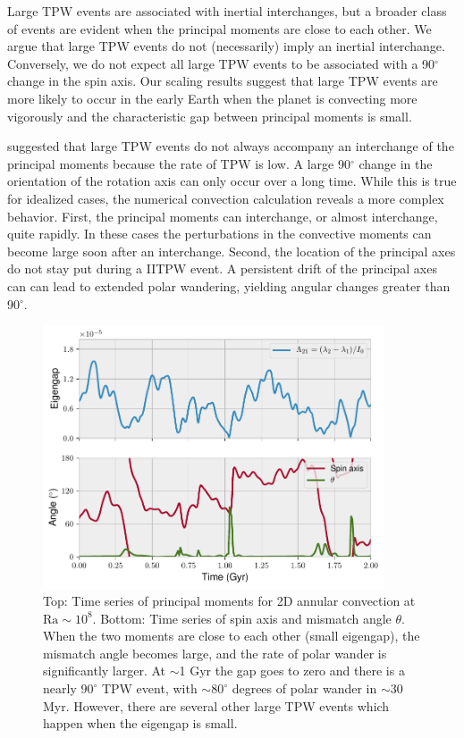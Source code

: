 \documentclass[preprint,12pt,authoryear]{elsarticle}
\begin{document}
Large TPW events are associated with inertial interchanges, but a broader class of events are evident
when the principal moments are close to each other. We argue that large TPW events do not (necessarily) imply an inertial interchange. Conversely, we do not expect all large TPW events to be associated with a 90$^{\circ}$ change in the spin axis. Our scaling results suggest that large TPW events are more likely to occur in the early Earth when the planet is convecting more vigorously and the characteristic gap between principal moments is small.


\citet{tsai2007theoretical} suggested that large TPW events do not always accompany an interchange of the principal moments because the rate of TPW is low. A large 90$^{\circ}$ change in the orientation of the rotation axis can only occur over a long time.  While
this is true for idealized cases, the numerical convection calculation reveals a more complex behavior. 
First, the principal moments can interchange, or almost interchange, quite rapidly. In these cases  the perturbations in the convective moments can become large soon after an interchange.
Second, the location of the principal axes do not stay put during a IITPW event. A persistent drift of the principal axes can can lead to extended polar wandering, yielding angular changes greater than 90$^\circ$.

\begin{figure}
\centering
\includegraphics[width=0.9\textwidth]{figures/misfit.pdf}
\caption{Top: Time series of principal moments for 2D annular convection at $\mathrm{Ra}\sim10^8$.  Bottom: Time series of spin axis and mismatch angle $\theta$.  When the two moments are close to each other (small eigengap), the mismatch angle becomes large, and the rate of polar wander is significantly larger. At $\sim$1 Gyr the gap goes to zero and there is a nearly $90^\circ$ TPW event, with $\sim80^\circ$ degrees of polar wander in $\sim$30 Myr. However, there are several other large TPW events which happen when the eigengap is small.}
\label{fig:misfit}
\end{figure}
\end{document}
